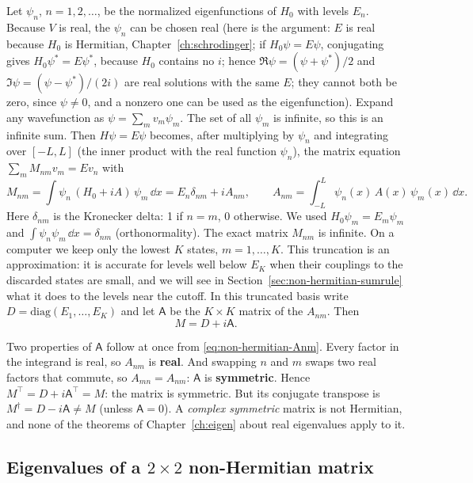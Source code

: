 Let $\psi_n$, $n=1,2,\dots$, be the normalized eigenfunctions of $H_0$ with levels $E_n$. Because $V$ is real, the $\psi_n$ can be chosen real (here is the argument: $E$ is real because $H_0$ is Hermitian, Chapter~\ref{ch:schrodinger}; if $H_0\psi=E\psi$, conjugating gives $H_0\psi^*=E\psi^*$, because $H_0$ contains no $i$; hence $\Re\psi=(\psi+\psi^*)/2$ and $\Im\psi=(\psi-\psi^*)/(2i)$ are real solutions with the same $E$; they cannot both be zero, since $\psi\ne0$, and a nonzero one can be used as the eigenfunction). Expand any wavefunction as $\psi=\sum_m v_m\psi_m$. The set of all $\psi_m$ is infinite, so this is an infinite sum. Then $H\psi=E\psi$ becomes, after multiplying by $\psi_n$ and integrating over $[-L,L]$ (the inner product with the real function $\psi_n$), the matrix equation $\sum_m M_{nm}v_m = E v_n$ with
\begin{equation}
M_{nm} = \int\psi_n\,(H_0+iA)\,\psi_m\,\dd x = E_n\delta_{nm} + iA_{nm},
\qquad
A_{nm} = \int_{-L}^{L}\psi_n(x)\,A(x)\,\psi_m(x)\,\dd x .
\label{eq:non-hermitian-Anm}
\end{equation}
Here $\delta_{nm}$ is the Kronecker delta: 1 if $n=m$, 0 otherwise. We used $H_0\psi_m = E_m\psi_m$ and $\int\psi_n\psi_m\,\dd x=\delta_{nm}$ (orthonormality). The exact matrix $M_{nm}$ is infinite. On a computer we keep only the lowest $K$ states, $m=1,\dots,K$. This truncation is an approximation: it is accurate for levels well below $E_K$ when their couplings to the discarded states are small, and we will see in Section~\ref{sec:non-hermitian-sumrule} what it does to the levels near the cutoff. In this truncated basis write $D=\mathrm{diag}(E_1,\dots,E_K)$ and let $\mathsf{A}$ be the $K\times K$ matrix of the $A_{nm}$. Then
\begin{equation}
M = D + i\mathsf{A}.
\label{eq:non-hermitian-M}
\end{equation}

Two properties of $\mathsf A$ follow at once from \eqref{eq:non-hermitian-Anm}. Every factor in the integrand is real, so $A_{nm}$ is \textbf{real}. And swapping $n$ and $m$ swaps two real factors that commute, so $A_{mn}=A_{nm}$: $\mathsf A$ is \textbf{symmetric}. Hence $M^\top = D + i\mathsf A^\top = M$: the matrix is symmetric. But its conjugate transpose is $M^\dagger = D - i\mathsf A \ne M$ (unless $\mathsf A=0$). A \emph{complex symmetric} matrix is not Hermitian, and none of the theorems of Chapter~\ref{ch:eigen} about real eigenvalues apply to it.

\subsection{Eigenvalues of a $2\times2$ non-Hermitian matrix}

